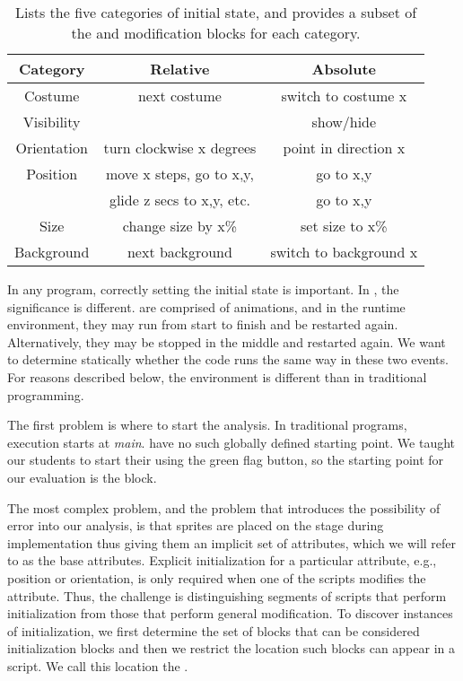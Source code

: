 \begin{table}
\centering
\begin{tabular}{|c|c|c|} \hline
Category & Relative&Absolute\\ \hline \hline
Costume& next costume & switch to costume x\\ \hline
Visibility& & show/hide\\ \hline
Orientation&turn clockwise x degrees&point in direction x\\ \hline
Position&move x steps, go to x,y,&go to x,y\\
&glide z secs to x,y, etc.&go to x,y\\ \hline
Size&change size by x\% & set size to x\%\\ \hline
Background&next background & switch to background x\\ \hline
\end{tabular}
\caption{Lists the five categories of initial state, and provides a subset of
  the \rel{} and \abs{} modification blocks for each category.}
\end{table}


In any program, correctly setting the initial state is important.  In
, the significance is different.   are comprised of
animations, and in the runtime environment, they may run from start to finish
and be restarted again.  Alternatively, they may be stopped in the middle and
restarted again.  We want to determine statically whether the code runs the
same way in these two events.  For reasons described below, the environment is
different than in traditional programming.

The first problem is where to start the analysis.  In traditional programs,
execution starts at \emph{main}.   have no such globally defined
starting point.  We taught our students to start their \sprogram{} using the
green flag button, so the starting point for our evaluation is the \greenflag{}
block.

The most complex problem, and the problem that introduces the possibility of
error into our analysis, is that sprites are placed on the stage during
implementation thus giving them an implicit set of attributes, which we will
refer to as the base attributes. Explicit initialization for a particular
attribute, e.g., position or orientation, is only required when one of the
 scripts modifies the attribute. Thus, the challenge is
distinguishing segments of scripts that perform initialization from those that
perform general modification. To discover instances of initialization, we first
determine the set of blocks that can be considered initialization blocks and
then we restrict the location such blocks can appear in a script. We call this
location the \initzone{}.

